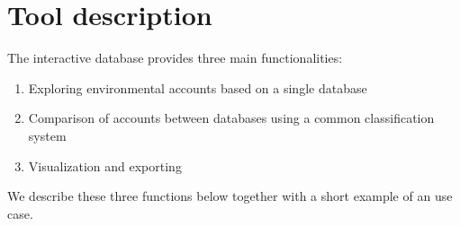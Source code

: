 \section{Tool description}

The interactive database provides three main functionalities:

\begin{enumerate}
\item Exploring environmental accounts based on a single database
\item Comparison of accounts between databases using a common classification system
\item Visualization and exporting
\end{enumerate}

We describe these three functions below together with a short example of an use case.
